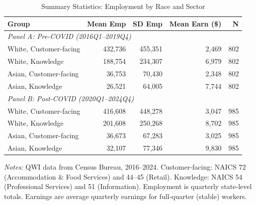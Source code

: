 \begin{table}[t]
\centering
\caption{Summary Statistics: Employment by Race and Sector}
\label{tab:summary}
\small
\begin{threeparttable}
\begin{tabular}{lrrrr}
\toprule
Group & Mean Emp & SD Emp & Mean Earn (\$) & N \\
\midrule
\multicolumn{5}{l}{\textit{Panel A: Pre-COVID (2016Q1--2019Q4)}} \\
White, Customer-facing & 432,736 & 455,351 & 2,469 & 802 \\
White, Knowledge & 188,754 & 234,307 & 6,979 & 802 \\
Asian, Customer-facing & 36,753 & 70,430 & 2,348 & 802 \\
Asian, Knowledge & 26,521 & 64,005 & 7,744 & 802 \\
\midrule
\multicolumn{5}{l}{\textit{Panel B: Post-COVID (2020Q1--2024Q4)}} \\
White, Customer-facing & 416,608 & 448,278 & 3,047 & 985 \\
White, Knowledge & 201,608 & 250,268 & 8,702 & 985 \\
Asian, Customer-facing & 36,673 & 67,283 & 3,025 & 985 \\
Asian, Knowledge & 32,107 & 77,346 & 9,830 & 985 \\
\bottomrule
\end{tabular}
\begin{tablenotes}\small
\item \textit{Notes:} QWI data from Census Bureau, 2016--2024. Customer-facing: NAICS 72 (Accommodation \& Food Services) and 44--45 (Retail). Knowledge: NAICS 54 (Professional Services) and 51 (Information). Employment is quarterly state-level totals. Earnings are average quarterly earnings for full-quarter (stable) workers.
\end{tablenotes}
\end{threeparttable}
\end{table}
